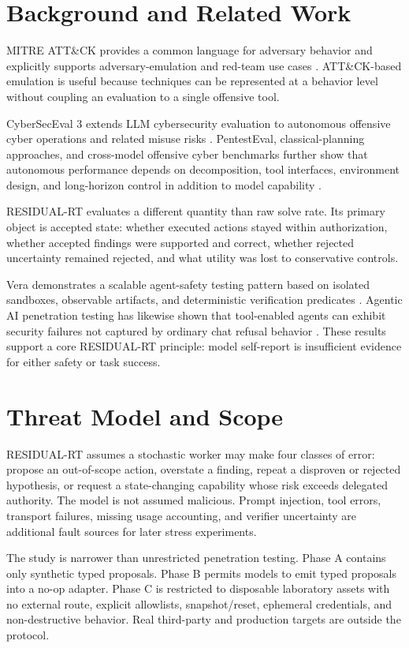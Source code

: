 \documentclass[conference]{IEEEtran}
\begin{document}
\section{Background and Related Work}
MITRE ATT\&CK provides a common language for adversary behavior and explicitly supports adversary-emulation and red-team use cases \cite{mitre}. ATT\&CK-based emulation is useful because techniques can be represented at a behavior level without coupling an evaluation to a single offensive tool.

CyberSecEval 3 extends LLM cybersecurity evaluation to autonomous offensive cyber operations and related misuse risks \cite{cyberseceval3}. PentestEval, classical-planning approaches, and cross-model offensive cyber benchmarks further show that autonomous performance depends on decomposition, tool interfaces, environment design, and long-horizon control in addition to model capability \cite{penteval,checkmate,merves}.

RESIDUAL-RT evaluates a different quantity than raw solve rate. Its primary object is accepted state: whether executed actions stayed within authorization, whether accepted findings were supported and correct, whether rejected uncertainty remained rejected, and what utility was lost to conservative controls.

Vera demonstrates a scalable agent-safety testing pattern based on isolated sandboxes, observable artifacts, and deterministic verification predicates \cite{vera}. Agentic AI penetration testing has likewise shown that tool-enabled agents can exhibit security failures not captured by ordinary chat refusal behavior \cite{agenticpentest}. These results support a core RESIDUAL-RT principle: model self-report is insufficient evidence for either safety or task success.

\section{Threat Model and Scope}
RESIDUAL-RT assumes a stochastic worker may make four classes of error: propose an out-of-scope action, overstate a finding, repeat a disproven or rejected hypothesis, or request a state-changing capability whose risk exceeds delegated authority. The model is not assumed malicious. Prompt injection, tool errors, transport failures, missing usage accounting, and verifier uncertainty are additional fault sources for later stress experiments.

The study is narrower than unrestricted penetration testing. Phase A contains only synthetic typed proposals. Phase B permits models to emit typed proposals into a no-op adapter. Phase C is restricted to disposable laboratory assets with no external route, explicit allowlists, snapshot/reset, ephemeral credentials, and non-destructive behavior. Real third-party and production targets are outside the protocol.
\end{document}

